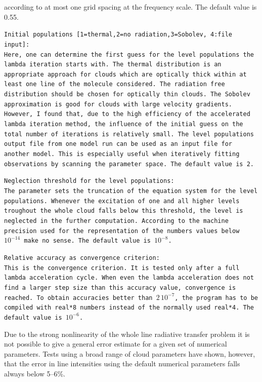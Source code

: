\begin{description}
according to at most one grid spacing at the frequency scale.
The default value is 0.55.
\item{}\tt Initial populations [1=thermal,2=no radiation,3=Sobolev,
  4:file input]:\\ \rm
Here, one can determine the first guess for the level populations the
lambda iteration starts with. 
The thermal distribution is an appropriate approach for clouds
which are optically thick within at least one line of the molecule
considered. The radiation free distribution should be chosen for
optically thin clouds. The Sobolev approximation is good for clouds
with large velocity gradients. However, I found that, due to the high
efficiency of the accelerated lambda iteration method, the influence
of the initial guess on the total number of iterations is relatively small.
The level populations output file from one model run can be used
as an input file for another model. This is especially useful when
iteratively fitting observations by scanning the parameter space.
The default value is 2.
\item{}\tt Neglection threshold for the level populations:\\ \rm
The parameter sets the truncation of the equation system for
the level populations. Whenever the excitation of one and all higher
levels troughout the whole cloud falls below this threshold, the
level is neglected in the further computation. According to the
machine precision used for the representation of the numbers
values below $10^{-14}$ make no sense.
The default value is $10^{-8}$.
\item{}\tt Relative accuracy as convergence criterion:\\ \rm
This is the convergence criterion. It is tested only after a full 
lambda acceleration cycle. When even the lambda acceleration does
not find a larger step size than this accuracy value, convergence
is reached. To obtain accuracies better than $2\,10^{-7}$, the
program has to be compiled with {\rm real*8} numbers instead of
the normally used {\rm real*4}. The default value is $10^{-6}$.
\end{description}

Due to the strong nonlinearity of the whole line radiative transfer
problem it is not possible to give a general error estimate for
a given set of numerical parameters. Tests using a broad range of
cloud parameters have shown, however, that the error in line intensities
using the default numerical parameters falls always below 5--6\%.

